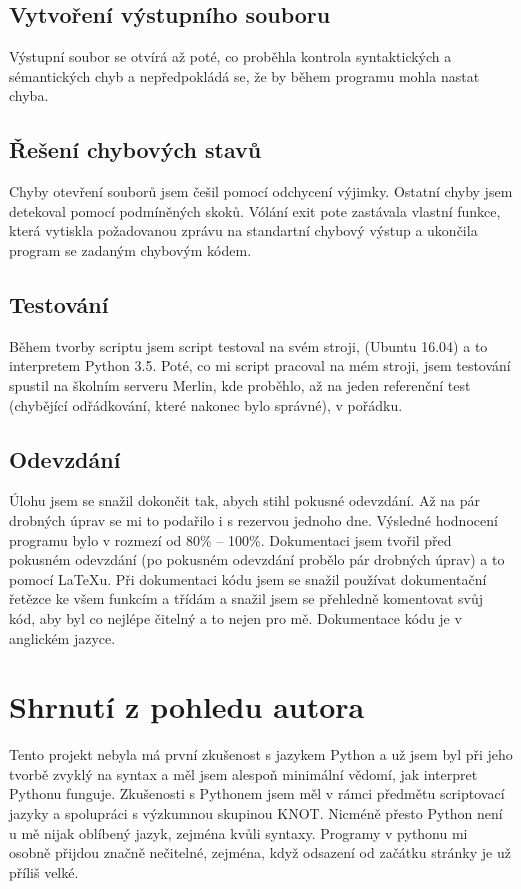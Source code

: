 \documentclass[a4paper, 10pt]{article}
\begin{document}
        \subsection{Vytvoření výstupního souboru}
            Výstupní soubor se otvírá až poté, co proběhla kontrola syntaktických
            a sémantických chyb a nepředpokládá se, že by během programu mohla nastat
            chyba.
        \subsection{Řešení chybových stavů}
            Chyby otevření souborů jsem češil pomocí odchycení výjimky. Ostatní
            chyby jsem detekoval pomocí podmíněných skoků. Vólání exit pote zastávala
            vlastní funkce, která vytiskla požadovanou zprávu na standartní chybový výstup
            a ukončila program se zadaným chybovým kódem.
        \subsection{Testování}
            Během tvorby scriptu jsem script testoval na svém stroji, (Ubuntu 16.04)
            a to interpretem Python 3.5. Poté, co mi script pracoval na mém stroji,
            jsem testování spustil na školním serveru Merlin, kde proběhlo, až na
            jeden referenční test (chybějící odřádkování, které nakonec bylo správné),
            v pořádku.
        \subsection{Odevzdání}
            Úlohu jsem se snažil dokončit tak, abych stihl pokusné odevzdání.
            Až na pár drobných úprav se mi to podařilo i s rezervou jednoho dne.
            Výsledné hodnocení programu bylo v rozmezí od 80\% -- 100\%.
            Dokumentaci jsem tvořil před pokusném odevzdání (po pokusném odevzdání
            probělo pár drobných úprav) a to pomocí \LaTeX u. Při dokumentaci
            kódu jsem se snažil používat dokumentační řetězce ke všem funkcím a
            třídám a snažil jsem se přehledně komentovat svůj kód, aby byl co
            nejlépe čitelný a to nejen pro mě. Dokumentace kódu je v anglickém
            jazyce.

    \section{Shrnutí z pohledu autora}
        Tento projekt nebyla má první zkušenost s jazykem Python a už jsem byl
        při jeho tvorbě zvyklý na syntax a měl jsem alespoň minimální vědomí, jak
        interpret Pythonu funguje. Zkušenosti s Pythonem jsem měl v rámci předmětu
        scriptovací jazyky a spolupráci s výzkumnou skupinou KNOT. Nicméně přesto
        Python není u mě nijak oblíbený jazyk, zejména kvůli syntaxy. Programy v
        pythonu mi osobně přijdou značně nečitelné, zejména, když odsazení
        od začátku stránky je už příliš velké.
\end{document}
